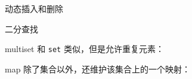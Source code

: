 \documentclass[10pt,mathserif]{beamer}
\newcommand{\lstcode}[1] {  }
\newcommand{\lstterm}[1] {  }
\begin{document}
\begin{frame}{动态插入和删除}
	\lstcode{set2.cc}
	\lstterm{set2.out}
\end{frame}

\begin{frame}{二分查找}
	\lstcode{set3.cc}
	\lstterm{set3.out}
\end{frame}

\begin{frame}{multiset}
	和 \lstinline{set} 类似，但是允许重复元素：
	\lstcode{multiset.cc}
	\lstterm{multiset.out}
\end{frame}

\begin{frame}{map}
	除了集合以外，还维护该集合上的一个映射：
	\lstcode{map.cc}
	\lstterm{map.out}
\end{frame}

{\xdbg%
\begin{frame}
\end{frame}}
\end{document}
